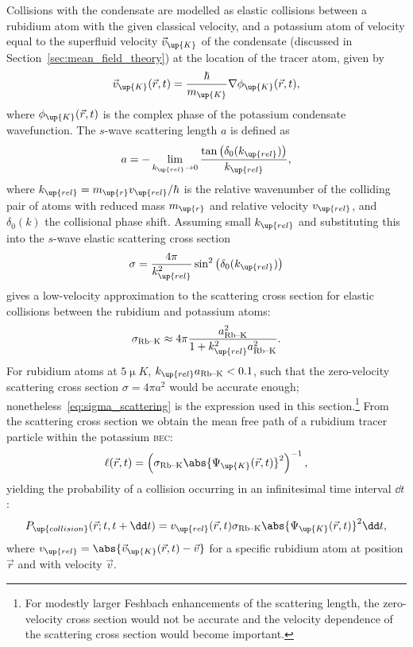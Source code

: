 Collisions with the condensate are modelled as elastic collisions between a rubidium atom with the given classical velocity, and a potassium atom of velocity equal to the superfluid velocity $\vec v_\up{K}$ of the condensate (discussed in Section~\ref{sec:mean_field_theory}) at the location of the tracer atom, given by
\begin{align}
\vec v_\up{K}(\vec r, t) = \frac \hbar {m_\up{K}} \nabla \phi_\up{K}(\vec r, t),
\end{align}
where $\phi_\up{K}(\vec r, t)$ is the complex phase of the potassium condensate wavefunction. The $s$-wave scattering length $a$ is defined as~\cite[p 589, eq.~12.101]{bransden_physics_2003}
\begin{align}
a = -\lim_{k_\up{rel}\rightarrow 0} \frac{\tan\left(\delta_0(k_\up{rel})\right)}{k_\up{rel}},
\end{align}
where $k_\up{rel}=m_\up{r}v_\up{rel}/\hbar$ is the relative wavenumber of the colliding pair of atoms with reduced mass $m_\up{r}$ and relative velocity $v_\up{rel}$, and $\delta_0(k)$ the collisional phase shift. Assuming small $k_\up{rel}$ and substituting this into the $s$-wave elastic scattering cross section~\cite[p 584, eq.~12.66]{bransden_physics_2003} 
\begin{align}
\sigma = \frac{4\pi}{k_\up{rel}^2}\sin^2\left(\delta_0(k_\up{rel})\right)
\end{align}
gives a low-velocity approximation to the scattering cross section for elastic collisions between the rubidium and potassium atoms:
\begin{align}\label{eq:sigma_scattering}
\sigma_{\textrm{Rb--K}} \approx 4\pi\frac{a_{\textrm{Rb--K}}^2}{1 + k_\up{rel}^2a_{\textrm{Rb--K}}^2}.
\end{align}
For rubidium atoms at $5\unit{\upmu K}$, $k_\up{rel}a_{\textrm{Rb--K}} < 0.1$, such that the zero-velocity scattering cross section $\sigma = 4\pi a^2$ would be accurate enough; nonetheless~\eqref{eq:sigma_scattering} is the expression used in this section.\footnote{For modestly larger Feshbach enhancements of the scattering length, the zero-velocity cross section would not be accurate and the velocity dependence of the scattering cross section would become important.} From the scattering cross section we obtain the mean free path of a rubidium tracer particle within the potassium \textsc{bec}:
\begin{align}
\ell(\vec r, t) = \left(\sigma_{\textrm{Rb--K}}\abs{\Psi_\up{K}(\vec r, t)}^2\right)^{-1},
\end{align}
yielding the probability of a collision occurring in an infinitesimal time interval $\dd t$:
\begin{align}\label{eq:P_collision}
P_\up{collision}(\vec r; t, t+\dd t) = v_\up{rel}(\vec r, t)\sigma_{\textrm{Rb--K}}\abs{\Psi_\up{K}(\vec r, t)}^2\dd t,
\end{align}
where $v_\up{rel} = \abs{\vec v_\up{K}(\vec r, t) - \vec v}$ for a specific rubidium atom at position $\vec r$ and with velocity $\vec v$.

